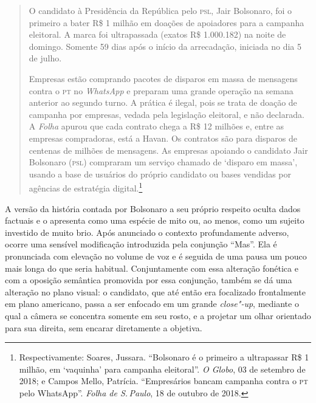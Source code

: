 \begin{quote}
O candidato à Presidência da República pelo \textsc{psl}, Jair
Bolsonaro, foi o primeiro a bater R\$ 1 milhão em doações de
apoiadores para a campanha eleitoral. A marca foi ultrapassada (exatos
R\$ 1.000.182) na noite de domingo. Somente 59 dias após o início da
arrecadação, iniciada no dia 5 de julho.

Empresas estão comprando pacotes de disparos em massa de mensagens
contra o \textsc{pt} no \emph{WhatsApp} e preparam uma grande operação na semana
anterior ao segundo turno. A prática é ilegal, pois se trata de doação
de campanha por empresas, vedada pela legislação eleitoral, e não
declarada. A \emph{Folha} apurou que cada contrato chega a R\$ 12
milhões e, entre as empresas compradoras, está a Havan. Os contratos são
para disparos de centenas de milhões de mensagens. As empresas apoiando
o candidato Jair Bolsonaro (\textsc{psl}) compraram um serviço chamado de
`disparo em massa', usando a base de usuários do próprio candidato ou
bases vendidas por agências de estratégia digital.\footnote{Respectivamente:
  Soares, Jussara. ``Bolsonaro é o primeiro a ultrapassar R\$ 1 milhão,
  em `vaquinha' para campanha eleitoral''. \emph{O Globo}, 03 de
  setembro de 2018; e Campos Mello, Patrícia. ``Empresários bancam campanha contra o \textsc{pt} pelo WhatsApp''. \emph{Folha de S.\,Paulo}, 18 de outubro de 2018.}
\end{quote}

A versão da história contada por Bolsonaro a seu próprio respeito oculta
dados factuais e o apresenta como uma espécie de mito ou, ao menos, como
um sujeito investido de muito brio. Após anunciado o contexto
profundamente adverso, ocorre uma sensível modificação introduzida pela
conjunção ``Mas''. Ela é pronunciada com elevação no volume de voz e é
seguida de uma pausa um pouco mais longa do que seria habitual.
Conjuntamente com essa alteração fonética e com a oposição semântica
promovida por essa conjunção, também se dá uma alteração no plano
visual: o candidato, que até então era focalizado frontalmente em plano
americano, passa a ser enfocado em um grande \emph{close"-up}, mediante o
qual a câmera se concentra somente em seu rosto, e a projetar um olhar
orientado para sua direita, sem encarar diretamente a objetiva.

